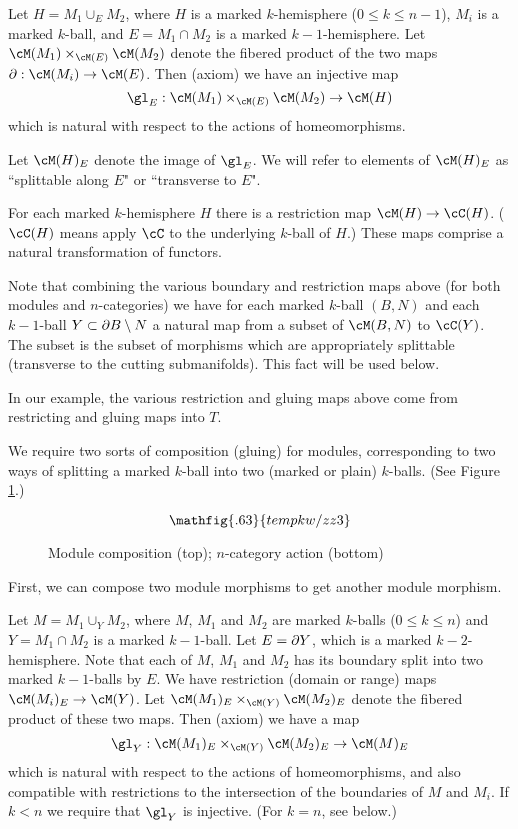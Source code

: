 {Let $H = M_1 \cup_E M_2$, where $H$ is a marked $k$-hemisphere ($0\le k\le n-1$),
$M_i$ is a marked $k$-ball, and $E = M_1\cap M_2$ is a marked $k{-}1$-hemisphere.
Let $\cM(M_1) \times_{\cM(E)} \cM(M_2)$ denote the fibered product of the 
two maps $\bd: \cM(M_i)\to \cM(E)$.
Then (axiom) we have an injective map
\[
	\gl_E : \cM(M_1) \times_{\cM(E)} \cM(M_2) \to \cM(H)
\]
which is natural with respect to the actions of homeomorphisms.}

Let $\cM(H)_E$ denote the image of $\gl_E$.
We will refer to elements of $\cM(H)_E$ as ``splittable along $E$" or ``transverse to $E$". 


{For each marked $k$-hemisphere $H$ there is a restriction map
$\cM(H)\to \cC(H)$.  
($\cC(H)$ means apply $\cC$ to the underlying $k$-ball of $H$.)
These maps comprise a natural transformation of functors.}

Note that combining the various boundary and restriction maps above
(for both modules and $n$-categories)
we have for each marked $k$-ball $(B, N)$ and each $k{-}1$-ball $Y\subset \partial B \setminus N$
a natural map from a subset of $\cM(B, N)$ to $\cC(Y)$.
The subset is the subset of morphisms which are appropriately splittable (transverse to the
cutting submanifolds).
This fact will be used below.

In our example, the various restriction and gluing maps above come from
restricting and gluing maps into $T$.

We require two sorts of composition (gluing) for modules, corresponding to two ways
of splitting a marked $k$-ball into two (marked or plain) $k$-balls.
(See Figure \ref{zzz3}.)

\begin{figure}[!ht]
\begin{equation*}
\mathfig{.63}{tempkw/zz3}
\end{equation*}
\caption{Module composition (top); $n$-category action (bottom)}
\label{zzz3}
\end{figure}

First, we can compose two module morphisms to get another module morphism.

{Let $M = M_1 \cup_Y M_2$, where $M$, $M_1$ and $M_2$ are marked $k$-balls ($0\le k\le n$)
and $Y = M_1\cap M_2$ is a marked $k{-}1$-ball.
Let $E = \partial Y$, which is a marked $k{-}2$-hemisphere.
Note that each of $M$, $M_1$ and $M_2$ has its boundary split into two marked $k{-}1$-balls by $E$.
We have restriction (domain or range) maps $\cM(M_i)_E \to \cM(Y)$.
Let $\cM(M_1)_E \times_{\cM(Y)} \cM(M_2)_E$ denote the fibered product of these two maps. 
Then (axiom) we have a map
\[
	\gl_Y : \cM(M_1)_E \times_{\cM(Y)} \cM(M_2)_E \to \cM(M)_E
\]
which is natural with respect to the actions of homeomorphisms, and also compatible with restrictions
to the intersection of the boundaries of $M$ and $M_i$.
If $k < n$ we require that $\gl_Y$ is injective.
(For $k=n$, see below.)}



